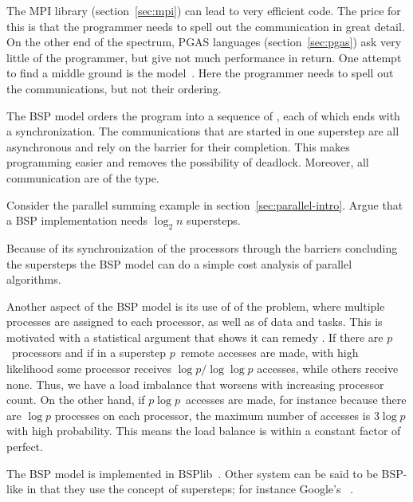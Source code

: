 The MPI library (section~\ref{sec:mpi}) can lead to very efficient
code. The price for this is that the programmer needs to spell out the
communication in great detail. On the other end of the spectrum, PGAS
languages (section~\ref{sec:pgas}) ask very little of the programmer,
but give not much performance in return. One attempt to find a middle
ground is the 
model~\cite{Valiant:1990:BSP,Skillicorn96questionsand}. Here the
programmer needs to spell out the communications, but not their
ordering.

The \ac{BSP} model orders the program into a sequence of
, each of which ends with a 
synchronization.  The communications that are started in one superstep
are all asynchronous and rely on the barrier for their completion.  This
makes programming easier and removes the possibility of deadlock.
Moreover, all communication are of the 
type.

\begin{exercise}
  Consider the parallel summing example in
  section~\ref{sec:parallel-intro}. Argue that a \ac{BSP}
  implementation needs $\log_2n$ supersteps.
\end{exercise}

Because of its synchronization of the processors through the barriers
concluding the supersteps the \ac{BSP} model can do a simple cost
analysis of parallel algorithms. 

Another aspect of the \ac{BSP} model is its use of  of the
problem, where multiple processes are assigned to each processor, as well as
 of data and tasks. This is motivated with a statistical
argument that shows it can remedy .
If there are $p$~processors and if in a superstep $p$~remote accesses are made,
with high likelihood some processor receives $\log p/\log \log p$ accesses, while
others receive none. Thus, we have a load imbalance that worsens with increasing
processor count. On the other hand, if $p\log p$~accesses are made, for
instance because there are $\log p$ processes on each processor, the maximum
number of accesses is $3\log p$ with high probability. This means the load balance 
is within a constant factor of perfect.

The \ac{BSP} model is implemented in BSPlib~\cite{BSPlib}.
Other system can be said to be BSP-like in that they use the concept
of supersteps; for instance Google's
~\cite{Pregel:podc2009}.

